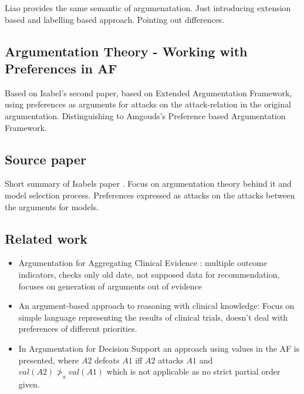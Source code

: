 Liao \cite[Chapter 2]{liao} provides the same semantic of argumenatation. Just introducing extension based and labelling based approach. Pointing out differences.

\subsection{Argumentation Theory - Working with Preferences in AF}
Based on Isabel's second paper\cite{sassoon2016}, based on Extended Argumentation Framework\cite{Modgil2009}, using preferences as arguments for attacks on the attack-relation in the original argumentation.
Distinguishing to Amgouds's\cite{amgoud}  Preference based Argumentation Framework.

\subsection{Source paper}
Short summary of Isabels paper \cite{sassoon2014}. Focus on argumentation theory behind it and model selection process. Preferences expressed as attacks on the attacks between the arguments for models.

\subsection{Related work}
\begin{itemize}
	\item Argumentation for Aggregating Clinical Evidence \cite{hunter}: multiple outcome indicators, checks only old date, not supposed data for recommendation, focuses on generation of arguments out of evidence
	\item An argument-based approach to reasoning with clinical knowledge\cite{Gorogiannis20091}: Focus on simple language representing the results of clinical trials, doesn't deal with preferences of different priorities.
	\item In Argumentation for Decision Support\cite{Atkinson2006} an approach using values in the AF is presented, where $A2$ defeats $A1$ iff $A2$ attacks $A1$ and $val(A2) \ngtr_a val(A1)$ which is not applicable as no strict partial order given.
\end{itemize}


